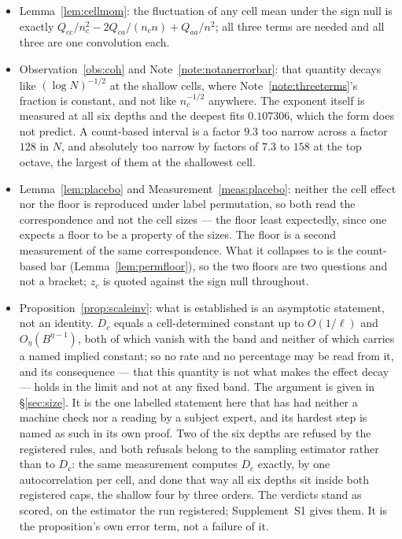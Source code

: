 \documentclass[11pt,a4paper]{article}
\theoremstyle{plain}
\theoremstyle{definition}
\theoremstyle{remark}
\begin{document}
\begin{itemize}
\item Lemma~\ref{lem:cellmom}: the fluctuation of any cell mean under
the sign null is exactly
$Q_{cc}/n_c^2-2Q_{ca}/(n_cn)+Q_{aa}/n^2$; all three terms are needed
and all three are one convolution each.

\item Observation~\ref{obs:coh} and Note~\ref{note:notanerrorbar}:
that quantity decays like $(\log N)^{-1/2}$ at the shallow cells,
where Note~\ref{note:threeterms}'s fraction is constant, and not like
$n_c^{-1/2}$ anywhere. The exponent itself is measured at all six
depths and the deepest fits $0.107306$, which the form does not
predict. A
count-based interval is a factor $9.3$ too narrow across a factor
$128$ in $N$, and absolutely too narrow by factors of $7.3$ to $158$ at
the top octave, the largest of them at the shallowest cell.

\item Lemma~\ref{lem:placebo} and Measurement~\ref{meas:placebo}:
neither the cell effect nor the floor is reproduced under label
permutation, so both read the correspondence and not the cell sizes
--- the floor least expectedly, since one expects a floor to be a
property of the sizes. The floor
is a second measurement of the same correspondence. What it collapses
to is the count-based bar (Lemma~\ref{lem:permfloor}), so the two
floors are two questions and not a bracket; $z_c$ is quoted against
the sign null throughout.

\item Proposition~\ref{prop:scaleinv}: what is established is an
asymptotic statement, not an identity. $D_c$ equals a cell-determined
constant up to $O(1/\ell)$ and $O_\eta(B^{\eta-1})$, both of which
vanish with the band and neither of which carries a named implied
constant; so no rate and no percentage may be read from it, and its
consequence --- that this quantity is not what makes the effect decay
--- holds in the limit and not at any fixed band. The argument is
given in \S\ref{sec:size}. It is the one labelled statement here
that has had neither a machine check nor a reading by a subject
expert, and its hardest step is named as such in its own proof.
Two of the six depths are refused by the registered rules, and both
refusals belong to the sampling estimator rather than to $D_c$: the
same measurement computes $D_c$ exactly, by one autocorrelation per
cell, and done that way all six depths sit inside both registered
caps, the shallow four by three orders. The verdicts stand as scored,
on the estimator the run registered; Supplement~S1 gives them. It is the proposition's own error term, not a failure of it.


\end{itemize}
\end{document}
